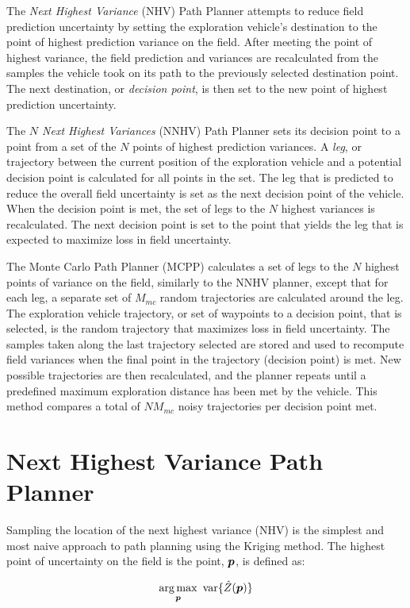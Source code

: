 The \textit{Next Highest Variance} (NHV) Path Planner attempts to reduce field prediction uncertainty by setting the exploration vehicle's destination to the point of highest prediction variance on the field. After meeting the point of highest variance, the field prediction and variances are recalculated from the samples the vehicle took on its path to the previously selected destination point. The next destination, or \textit{decision point}, is then set to the new point of highest prediction uncertainty.

The \textit{$N$ Next Highest Variances} (NNHV) Path Planner sets its decision point to a point from a set of the $N$ points of highest prediction variances. A \textit{leg}, or trajectory between the current position of the exploration vehicle and a potential decision point is calculated for all points in the set. The leg that is predicted to reduce the overall field uncertainty is set as the next decision point of the vehicle. When the decision point is met, the set of legs to the $N$ highest variances is recalculated. The next decision point is set to the point that yields the leg that is expected to maximize loss in field uncertainty.

The Monte Carlo Path Planner (MCPP) calculates a set of legs to the $N$ highest points of variance on the field, similarly to the NNHV planner, except that for each leg, a separate set of $M_{mc}$ random trajectories are calculated around the leg. The exploration vehicle trajectory, or set of waypoints to a decision point, that is selected, is the random trajectory that maximizes loss in field uncertainty. The samples taken along the last trajectory selected are stored and used to recompute field variances when the final point in the trajectory (decision point) is met. New possible trajectories are then recalculated, and the planner repeats until a predefined maximum exploration distance has been met by the vehicle. This method compares a total of $N M_{mc}$ noisy trajectories per decision point met. 

\section{Next Highest Variance Path Planner} \label{sec:nhvpp}
Sampling the location of the next highest variance (NHV) is the simplest and most naive approach to path planning using the Kriging method. The highest point of uncertainty on the field is the point, ${\it{\boldsymbol{p}}}$, is defined as:

\begin{equation}
\argmax_{\vect{p}} \ \text{var}\{\hat{Z}(\vect{p})\}
\end{equation}

